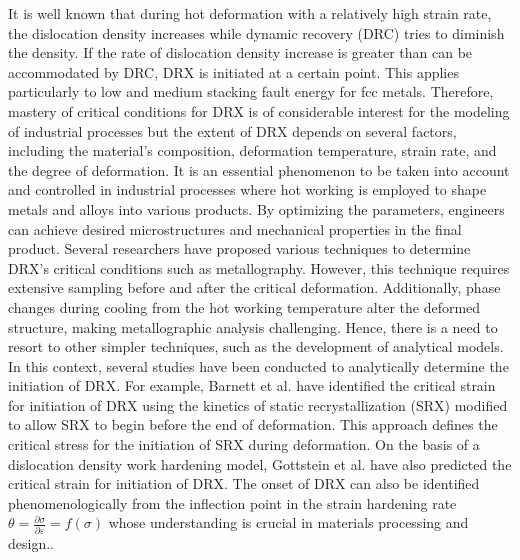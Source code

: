 \documentclass[metals,article,submit,pdftex,moreauthors]{Definitions/mdpi}
\makeatletter
\DeclareRobustCommand{\eal}{et al.\@\xspace}
\makeatother
\begin{document}
It is well known that during hot deformation with a relatively high strain rate, the dislocation density increases while dynamic recovery (DRC) tries to diminish the density.
If the rate of dislocation density increase is greater than can be accommodated by DRC, DRX is initiated at a certain point.
This applies particularly to low and medium stacking fault energy for fcc metals.
Therefore, mastery of critical conditions for DRX is of considerable interest for the modeling of industrial processes but the extent of DRX depends on several factors, including the material's composition, deformation temperature, strain rate, and the degree of deformation.
It is an essential phenomenon to be taken into account and controlled in industrial processes where hot working is employed to shape metals and alloys into various products.
By optimizing the parameters, engineers can achieve desired microstructures and mechanical properties in the final product.
Several researchers have proposed various techniques to determine DRX's critical conditions such as metallography.
However, this technique requires extensive sampling before and after the critical deformation.
Additionally, phase changes during cooling from the hot working temperature alter the deformed structure, making metallographic analysis challenging.
Hence, there is a need to resort to other simpler techniques, such as the development of analytical models.
In this context, several studies have been conducted to analytically determine the initiation of DRX.
For example, Barnett \eal \cite{barnett2000predicting} have identified the critical strain for initiation of DRX using the kinetics of static recrystallization (SRX) modified to allow SRX to begin before the end of deformation.
This approach defines the critical stress for the initiation of SRX during deformation.
On the basis of a dislocation density work hardening model, Gottstein \eal \cite{gottstein2004prediction} have also predicted the critical strain for initiation of DRX.
The onset of DRX can also be identified phenomenologically from the inflection point in the strain hardening rate $\theta=\frac{\partial \sigma}{\partial \varepsilon} = f(\sigma)$ whose understanding is crucial in materials processing and design..
\end{document}
